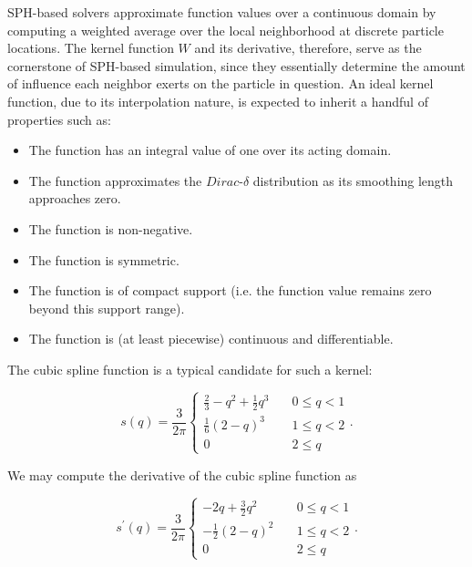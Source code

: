 \documentclass[
	11pt, 
	DIV10,
	ngerman,
	a4paper, 
	oneside, 
	headings=normal, 
	captions=tableheading,
	final, 
	numbers=noenddot
]{scrartcl}
\begin{document}
SPH-based solvers approximate function values over a continuous domain by computing a weighted average over the local neighborhood at discrete particle locations. The kernel function $ W $ and its derivative, therefore, serve as the cornerstone of SPH-based simulation, since they essentially determine the amount of influence each neighbor exerts on the particle in question. An ideal kernel function, due to its interpolation nature, is expected to inherit a handful of properties such as:

\begin{itemize}
    \item The function has an integral value of one over its acting domain.
    \item The function approximates the $ Dirac $-$ \delta $ distribution as its smoothing length approaches zero.
    \item The function is non-negative.
    \item The function is symmetric.
    \item The function is of compact support (i.e. the function value remains zero beyond this support range).
    \item The function is (at least piecewise) continuous and differentiable.
\end{itemize}

The cubic spline function is a typical candidate for such a kernel:

\begin{equation}
	\label{eq11}
	s\left(q\right) = \frac{3}{2\pi}\left\{
	\begin{array}{ll}
            \frac{2}{3} - q^{2} + \frac{1}{2}q^{3}	& \quad 0 \leq q < 1 \\[1em]
            \frac{1}{6}\left(2 - q\right)^{3}		& \quad 1 \leq q < 2 \\[1em]
            0	& \quad 2 \leq q
    \end{array}
    \right..
\end{equation}

We may compute the derivative of the cubic spline function as

\begin{equation}
	\label{eq12}
	s^{\prime}\left(q\right) = \frac{3}{2\pi}\left\{
	\begin{array}{ll}
            -2q + \frac{3}{2}q^{2}					& \quad 0 \leq q < 1 \\[1em]
            -\frac{1}{2}\left(2 - q\right)^{2}		& \quad 1 \leq q < 2 \\[1em]
            0	& \quad 2 \leq q
    \end{array}
    \right..
\end{equation}
\end{document}
